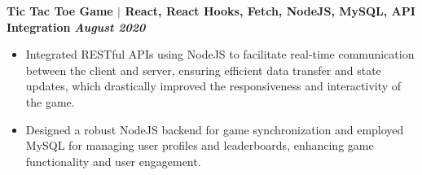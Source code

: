 \documentclass{article}
\begin{document}
\noindent \textbf{Tic Tac Toe Game $\mid$ React, React Hooks, Fetch, NodeJS, MySQL, API Integration} \textit{\hfill \textbf{August 2020}} 
\begin{itemize}[noitemsep,nolistsep,leftmargin=*]
  \item {\small Integrated RESTful APIs using NodeJS to facilitate real-time communication between the client and server, ensuring efficient data transfer and state updates, which drastically improved the responsiveness and interactivity of the game.}
  \item {\small Designed a robust NodeJS backend for game synchronization and employed MySQL for managing user profiles and leaderboards, enhancing game functionality and user engagement.}
\end{itemize}




\end{document}
